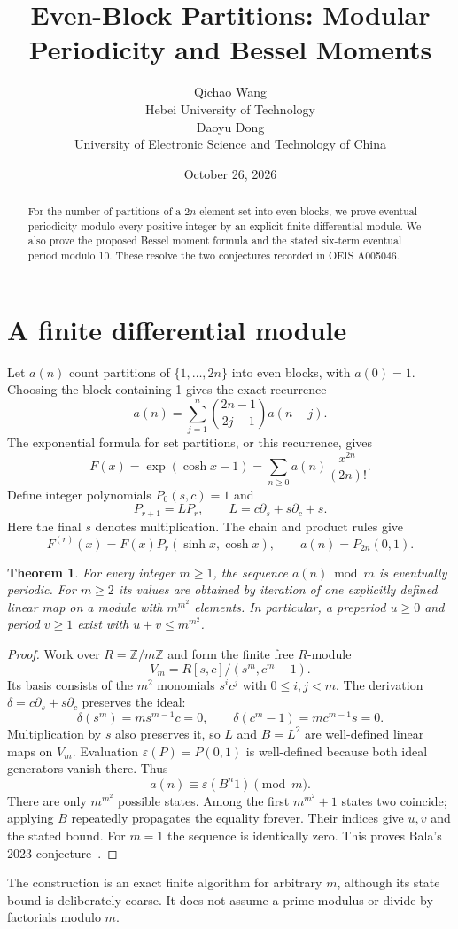 \documentclass[10pt]{article}
\title{Even-Block Partitions: Modular Periodicity and Bessel Moments}
\author{Qichao Wang\\{\small Hebei University of Technology}\\[0.3em]
Daoyu Dong\\{\small University of Electronic Science and Technology of China}}
\date{October 26, 2026}
\newtheorem{theorem}{Theorem}
\begin{document}
\maketitle
\begin{abstract}
For the number of partitions of a $2n$-element set into even blocks, we prove
eventual periodicity modulo every positive integer by an explicit finite
differential module. We also prove the proposed Bessel moment formula and
the stated six-term eventual period modulo 10. These resolve the two
conjectures recorded in OEIS A005046.
\end{abstract}

\section{A finite differential module}
Let $a(n)$ count partitions of $\{1,\ldots,2n\}$ into even blocks, with
$a(0)=1$. Choosing the block containing 1 gives the exact recurrence
\[
 a(n)=\sum_{j=1}^n\binom{2n-1}{2j-1}a(n-j).
\]
The exponential formula for set partitions, or this recurrence, gives
\[
 F(x)=\exp(\cosh x-1)=\sum_{n\ge0}a(n)\frac{x^{2n}}{(2n)!}.
\]
Define integer polynomials $P_0(s,c)=1$ and
\[
 P_{r+1}=L P_r,\qquad L=c\partial_s+s\partial_c+s.
\]
Here the final $s$ denotes multiplication. The chain and product rules give
\[
 F^{(r)}(x)=F(x)P_r(\sinh x,\cosh x),\qquad a(n)=P_{2n}(0,1).
\]

\begin{theorem}
For every integer $m\ge1$, the sequence $a(n)\bmod m$ is eventually periodic.
For $m\ge2$ its values are obtained by iteration of one explicitly defined
linear map on a module with $m^{m^2}$ elements. In particular, a preperiod
$u\ge0$ and period $v\ge1$ exist with $u+v\le m^{m^2}$.
\end{theorem}
\begin{proof}
Work over $R=\mathbb Z/m\mathbb Z$ and form the finite free $R$-module
\[
 V_m=R[s,c]/(s^m,c^m-1).
\]
Its basis consists of the $m^2$ monomials $s^ic^j$ with $0\le i,j<m$.
The derivation $\delta=c\partial_s+s\partial_c$ preserves the ideal:
\[
 \delta(s^m)=m s^{m-1}c=0,\qquad
 \delta(c^m-1)=m c^{m-1}s=0.
\]
Multiplication by $s$ also preserves it, so $L$ and $B=L^2$ are well-defined
linear maps on $V_m$. Evaluation $\varepsilon(P)=P(0,1)$ is well-defined
because both ideal generators vanish there. Thus
\[
 a(n)\equiv\varepsilon(B^n1)\pmod m.
\]
There are only $m^{m^2}$ possible states. Among the first $m^{m^2}+1$
states two coincide; applying $B$ repeatedly propagates the equality
forever. Their indices give $u,v$ and the stated bound. For $m=1$ the
sequence is identically zero. This proves Bala's 2023 conjecture~\cite{oeis}.
\end{proof}
The construction is an exact finite algorithm for arbitrary $m$, although its
state bound is deliberately coarse. It does not assume a prime modulus or
divide by factorials modulo $m$.
\end{document}

